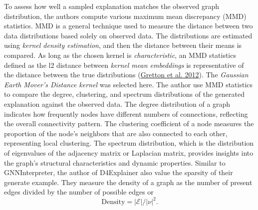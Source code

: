 \documentclass[
  11pt,
  letterpaper,
]{article}
\begin{document}
\quad To assess how well a sampled explanation matches the observed
graph distribution, the authors compute various maximum mean discrepancy
(MMD) statistics. MMD is a general technique used to measure the
distance between two data distributions based solely on observed data.
The distributions are estimated using \emph{kernel density estimation},
and then the distance between their means is compared. As long as the
chosen kernel is \emph{characteristic}, an MMD statistics defined as the
l2 distance between \emph{kernel mean embeddings} is representative of
the distance between the true distributions
(\protect\hyperlink{ref-Gretton_Borgwardt_Rasch_Schuxf6lkopf_Smola_2012}{Gretton
et al. 2012}). The \emph{Gaussian Earth Mover's Distance kernel} was
selected here. The author use MMD statistics to compare the degree,
clustering, and spectrum distributions of the generated explanation
against the observed data. The degree distribution of a graph indicates
how frequently nodes have different numbers of connections, reflecting
the overall connectivity pattern. The clustering coefficient of a node
measures the proportion of the node's neighbors that are also connected
to each other, representing local clustering. The spectrum distribution,
which is the distribution of eigenvalues of the adjacency matrix or
Laplacian matrix, provides insights into the graph's structural
characteristics and dynamic properties. Similar to GNNInterpreter, the
author of D4Explainer also value the sparsity of their generate example.
They measure the density of a graph as the number of present edges
divided by the number of possible edges or \begin{equation}
        \text{Density} = \mathcal{|E|} / |\nu|^2. 
    \end{equation}
\end{document}
